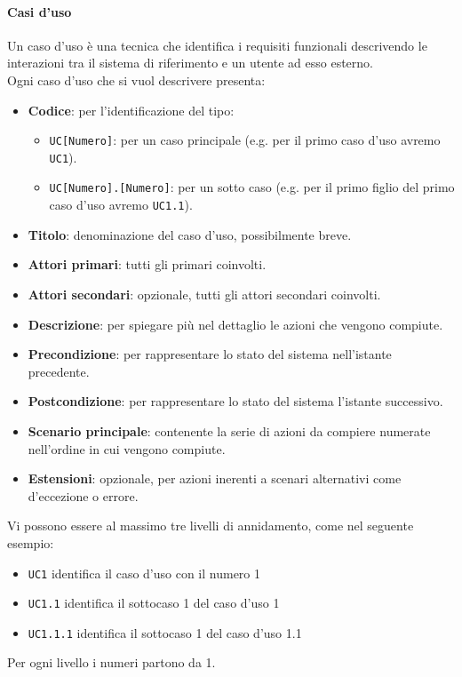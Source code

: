 		\paragraph{Casi d'uso}\label{PP:Sviluppo:AdR:CasiUso}
		Un caso d'uso è una tecnica che identifica i requisiti funzionali descrivendo le interazioni tra il sistema di riferimento e un utente ad esso esterno.\\
		Ogni caso d'uso che si vuol descrivere presenta:
		\begin{itemize}
		 	\item \textbf{Codice}: per l'identificazione del tipo:
		 	\begin{itemize}
		 		\item \texttt{UC[Numero]}: per un caso principale (e.g. per il primo caso d'uso avremo \texttt{UC1}).
		 		\item \texttt{UC[Numero].[Numero]}: per un sotto caso (e.g. per il primo figlio del primo caso d'uso avremo \texttt{UC1.1}).
			\end{itemize}
		 	\item \textbf{Titolo}: denominazione del caso d'uso, possibilmente breve.
		 	\item \textbf{Attori primari}: tutti gli  primari coinvolti.
		 	\item \textbf{Attori secondari}: opzionale, tutti gli attori secondari coinvolti.
		 	\item \textbf{Descrizione}: per spiegare più nel dettaglio le azioni che vengono compiute.
		 	\item \textbf{Precondizione}: per rappresentare lo stato del sistema nell'istante precedente.
		 	\item \textbf{Postcondizione}: per rappresentare lo stato del sistema l'istante successivo.
		 	\item \textbf{Scenario principale}: contenente la serie di azioni da compiere numerate nell'ordine in cui vengono compiute.
		 	\item \textbf{Estensioni}: opzionale, per azioni inerenti a scenari alternativi come d'eccezione o errore.
		\end{itemize}

		Vi possono essere al massimo tre livelli di annidamento, come nel seguente esempio:
		\begin{itemize}
			\item \texttt{UC1} identifica il caso d'uso con il numero 1
			\item \texttt{UC1.1} identifica il sottocaso 1 del caso d'uso 1
			\item \texttt{UC1.1.1} identifica il sottocaso 1 del caso d'uso 1.1
		\end{itemize}
		Per ogni livello i numeri partono da 1.

